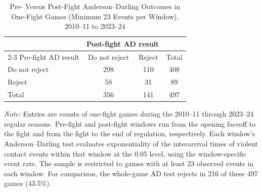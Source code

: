\begin{table}[htbp]
\centering
\caption{Pre- Versus Post-Fight Anderson--Darling Outcomes in One-Fight Games (Minimum 23 Events per Window), 2010--11 to 2023--24}
\label{tab:one_fight_AD_rejection_min_23_20102011_20232024}
\small
\renewcommand{\arraystretch}{1.15}
\setlength{\tabcolsep}{6pt}

\begin{tabular*}{0.78\textwidth}{@{\extracolsep{\fill}}lccc}
\toprule
 & \multicolumn{2}{c}{Post-fight AD result} & \\
\cmidrule(lr){2-3}
Pre-fight AD result & Do not reject & Reject & Total \\
\midrule
Do not reject & 298 & 110 & 408 \\
Reject & 58 & 31 & 89 \\
\midrule
Total & 356 & 141 & 497 \\
\bottomrule
\end{tabular*}

\vspace{0.4em}
\parbox{0.78\textwidth}{
\footnotesize
\textit{Note:} Entries are counts of one-fight games during the 2010--11 through 2023--24 regular seasons. Pre-fight and post-fight windows run from the opening faceoff to the fight and from the fight to the end of regulation, respectively. Each window's Anderson--Darling test evaluates exponentiality of the interarrival times of violent contact events within that window at the 0.05 level, using the window-specific event rate. The sample is restricted to games with at least 23 observed events in each window. For comparison, the whole-game AD test rejects in 216 of these 497 games (43.5\%).
}
\end{table}
